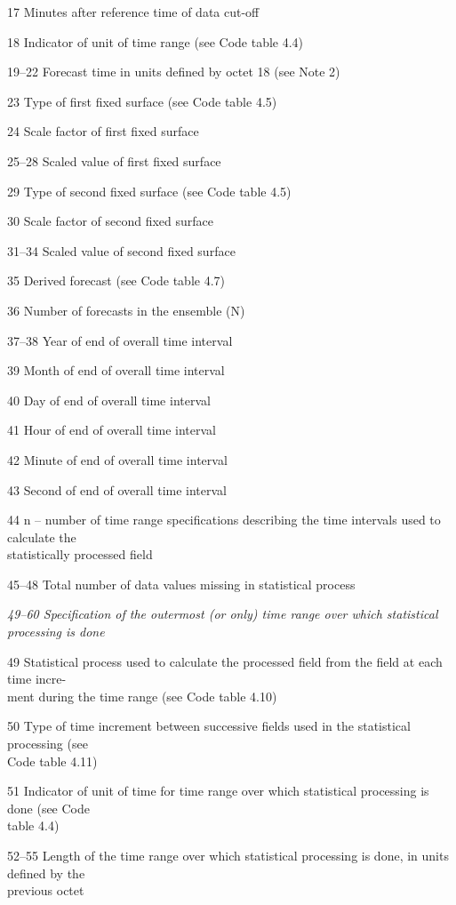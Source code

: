 17 Minutes after reference time of data cut-off

18 Indicator of unit of time range (see Code table 4.4)

19--22 Forecast time in units defined by octet 18 (see Note 2)

23 Type of first fixed surface (see Code table 4.5)

24 Scale factor of first fixed surface

25--28 Scaled value of first fixed surface

29 Type of second fixed surface (see Code table 4.5)

30 Scale factor of second fixed surface

31--34 Scaled value of second fixed surface

35 Derived forecast (see Code table 4.7)

36 Number of forecasts in the ensemble (N)

37--38 Year of end of overall time interval

39 Month of end of overall time interval

40 Day of end of overall time interval

41 Hour of end of overall time interval

42 Minute of end of overall time interval

43 Second of end of overall time interval

44 n -- number of time range specifications describing the time intervals used to calculate the\\
statistically processed field

45--48 Total number of data values missing in statistical process

\emph{49--60 Specification of the outermost (or only) time range over which statistical}\\
\emph{processing is done}

49 Statistical process used to calculate the processed field from the field at each time incre-\\
ment during the time range (see Code table 4.10)

50 Type of time increment between successive fields used in the statistical processing (see\\
Code table 4.11)

51 Indicator of unit of time for time range over which statistical processing is done (see Code\\
table 4.4)

52--55 Length of the time range over which statistical processing is done, in units defined by the\\
previous octet

